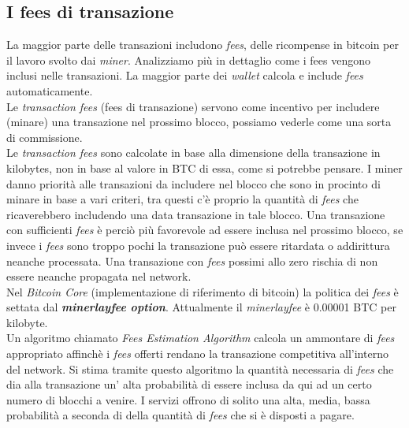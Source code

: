 \subsection{I fees di transazione}
La maggior parte delle transazioni includono \textit{fees}, delle ricompense in bitcoin per il lavoro svolto dai \textit{miner}. Analizziamo pi\`u in dettaglio come i fees vengono inclusi nelle transazioni. La maggior parte dei \textit{wallet} calcola e include \textit{fees} automaticamente.\\
Le \textit{transaction fees} (fees di transazione) servono come incentivo per includere (minare) una transazione nel prossimo blocco, possiamo vederle come una sorta di commissione.\\
Le \textit{transaction fees} sono calcolate in base alla dimensione della transazione in kilobytes, non in base al valore in BTC di essa, come si potrebbe pensare. I miner danno priorit\`a alle transazioni da includere nel blocco che sono in procinto di minare in base a vari criteri, tra questi c'\`e proprio la quantit\`a di 	\textit{fees} che ricaverebbero includendo una data transazione in tale blocco. Una transazione con sufficienti \textit{fees} \`e perci\`o pi\`u favorevole ad essere inclusa nel prossimo blocco, se invece i \textit{fees} sono troppo pochi la transazione pu\`o essere ritardata o addirittura neanche processata. Una transazione con \textit{fees} possimi allo zero rischia di non essere neanche propagata nel network.\\
Nel \textit{Bitcoin Core} (implementazione di riferimento di bitcoin) la politica dei \textit{fees} \`e settata dal \textbf{\textit{minerlayfee option}}. Attualmente il \textit{minerlayfee} \`e 0.00001 BTC per kilobyte.\\
Un algoritmo chiamato \textit{Fees Estimation Algorithm} calcola un ammontare di \textit{fees} appropriato affinch\`e i \textit{fees} offerti rendano la transazione competitiva all'interno del network. Si stima tramite questo algoritmo la quantit\`a necessaria di \textit{fees} che dia alla transazione un' alta probabilit\`a di essere inclusa da qui ad un certo numero di blocchi a venire. I servizi offrono di solito una alta, media, bassa probabilit\`a a seconda di della quantit\`a di \textit{fees} che si \`e disposti a pagare.\\


